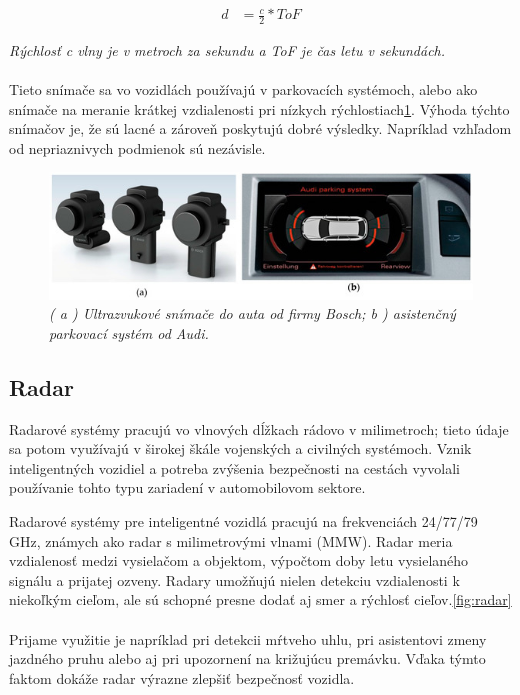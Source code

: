 \documentclass[10pt,oneside,slovak,a4paper]{article}
\begin{document}
\begin{equation} \label{eq1}
	\begin{split}
	d & = \frac{c}{2} * {ToF}
	\end{split}
	\end{equation}

\emph{Rýchlosť c vlny je v metroch za sekundu a ToF je čas letu v sekundách.}
\\~\\
Tieto snímače sa vo vozidlách používajú v parkovacích systémoch, alebo ako snímače na meranie krátkej vzdialenosti pri nízkych rýchlostiach\ref{fig:ultrazvuk}. Výhoda týchto snímačov je, že sú lacné a zároveň poskytujú dobré výsledky. Napríklad vzhľadom od nepriaznivych podmienok sú nezávisle.

\begin{figure}[!h]
\centering
\includegraphics[scale=0.7]{senzory1.jpg}
\emph{( a ) Ultrazvukové snímače do auta od firmy Bosch; b ) asistenčný parkovací systém od Audi.}
\label{fig:ultrazvuk}
\end{figure}

\newpage

\subsection{Radar}
Radarové systémy pracujú vo vlnových dĺžkach rádovo v milimetroch; tieto údaje sa potom využívajú v širokej škále vojenských a civilných systémoch. Vznik inteligentných vozidiel a potreba zvýšenia bezpečnosti na cestách vyvolali používanie tohto typu zariadení v automobilovom sektore. \par Radarové systémy pre inteligentné vozidlá pracujú na frekvenciách 24/77/79 GHz, známych ako radar s milimetrovými vlnami (MMW). Radar meria vzdialenosť medzi vysielačom a objektom, výpočtom doby letu vysielaného signálu a prijatej ozveny. Radary umožňujú nielen detekciu vzdialenosti k niekoľkým cieľom, ale sú schopné presne dodať aj smer a rýchlosť cieľov.\ref{fig:radar}
\\~\\
Prijame využitie je napríklad pri detekcii mŕtveho uhlu, pri asistentovi zmeny jazdného pruhu alebo aj pri upozornení na križujúcu premávku. Vďaka týmto faktom dokáže radar výrazne zlepšiť bezpečnosť vozidla.\cite{s19030648}
\end{document}
